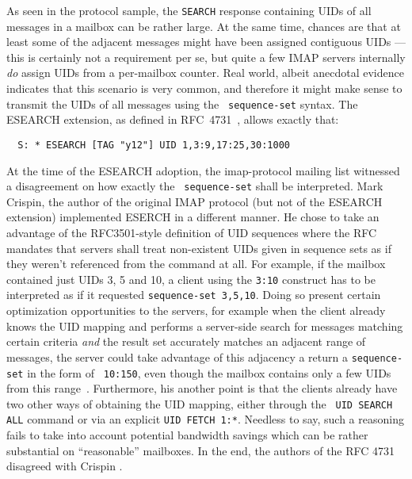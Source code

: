 \documentclass[trojita]{subfiles}
\begin{document}
As seen in the protocol sample, the {\tt SEARCH} response containing UIDs of all messages in a mailbox can be rather
large.  At the same time, chances are that at least some of the adjacent messages might have been assigned contiguous
UIDs --- this is certainly not a requirement per se, but quite a few IMAP servers internally {\em do} assign UIDs from a
per-mailbox counter.  Real world, albeit anecdotal evidence \cite{cridland-uids-are-often-monotonic} indicates that this
scenario is very common, and therefore it might make sense to transmit the UIDs of all messages using the {\tt
sequence-set} \cite[p. 89]{rfc3501} syntax.  The ESEARCH extension, as defined in RFC~4731~\cite{rfc4731}, allows
exactly that:

\begin{verbatim}
  S: * ESEARCH [TAG "y12"] UID 1,3:9,17:25,30:1000
\end{verbatim}

At the time of the ESEARCH adoption, the imap-protocol mailing list witnessed a disagreement on how exactly the {\tt
sequence-set} shall be interpreted.  Mark Crispin, the author of the original IMAP protocol (but not of the ESEARCH
extension) implemented ESERCH in a different manner.  He chose to take an advantage of the RFC3501-style definition of
UID sequences where the RFC mandates that servers shall treat non-existent UIDs given in sequence sets as if they
weren't referenced from the command at all.  For example, if the mailbox contained just UIDs 3, 5 and 10, a client using
the {\tt 3:10} construct has to be interpreted as if it requested {\tt sequence-set 3,5,10}.  Doing so present certain
optimization opportunities to the servers, for example when the client already knows the UID mapping and performs a
server-side search for messages matching certain criteria {\em and} the result set accurately matches an adjacent range
of messages, the server could take advantage of this adjacency a return a {\tt sequence-set} in the form of {\tt
10:150}, even though the mailbox contains only a few UIDs from this range~\cite{crispin-esearch-flawed}.  Furthermore,
his another point is that the clients already have two other ways of obtaining the UID mapping, either through the {\tt
UID SEARCH ALL} command or via an explicit {\tt UID FETCH 1:*}.  Needless to say, such a reasoning fails to take into
account potential bandwidth savings which can be rather substantial on ``reasonable'' mailboxes.  In the end, the
authors of the RFC 4731 disagreed with Crispin \cite{melnikov-esearch-interpretation}
\cite{cridland-esearch-interpretation}.
\end{document}
